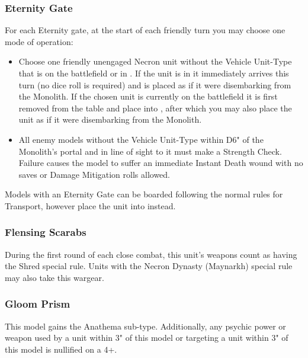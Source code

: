 \subsubsection{Eternity Gate} \label{Eternity Gate}

For each Eternity gate, at the start of each friendly turn you may choose one mode of operation:

\begin{itemize}
	\item Choose one friendly unengaged Necron unit without the Vehicle Unit-Type that is on the battlefield or in . If the unit is in  it immediately arrives this turn (no dice roll is required) and is placed as if it were disembarking from the Monolith. If the chosen unit is currently on the battlefield it is first removed from the table and place into , after which you may also place the unit as if it were disembarking from the Monolith.
	\item All enemy models without the Vehicle Unit-Type within D6" of the Monolith's portal and in line of sight to it must make a Strength Check. Failure causes the model to suffer an immediate Instant Death wound with no saves or Damage Mitigation rolls allowed.
\end{itemize}

Models with an Eternity Gate can be boarded following the normal rules for Transport, however place the unit into  instead.


\subsubsection{Flensing Scarabs} \label{Flensing Scarabs}

During the first round of each close combat, this unit's weapons count as having the Shred special rule. Units with the Necron Dynasty (Maynarkh) special rule may also take this wargear.

\subsubsection{Gloom Prism} \label{Gloom Prism}

This model gains the Anathema sub-type. Additionally, any psychic power or weapon used by a unit within 3" of this model or targeting a unit within 3" of this model is nullified on a 4+. \\

